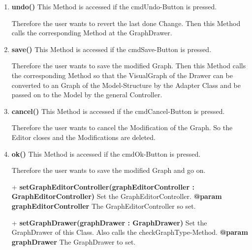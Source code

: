 \documentclass{article}
\begin{document}
\begin{enumerate}[-]
{						Therefore the user wants to add an Clique.
						Then this Method calls the corresponding Method at the GraphDrawer.
						\newline
					}
					\item{
						\textbf{undo()} \newline
						This Method is accessed if the cmdUndo-Button is pressed.
						
						Therefore the user wants to revert the last done Change.
						Then this Method calls the corresponding Method at the GraphDrawer.
						\newline
					}
					\item{
						\textbf{save()} \newline
						This Method is accessed if the cmdSave-Button is pressed.
						
						Therefore the user wants to save the modified Graph.
						Then this Method calls the corresponding Method so that the VisualGraph of the Drawer can be converted to an Graph of the Model-Structure by the Adapter Class and be passed on to the Model by the general Controller.
						\newline
					}
					\item{
						\textbf{cancel()} \newline
						This Method is accessed if the cmdCancel-Button is pressed.
						
						Therefore the user wants to cancel the Modification of the Graph.
						So the Editor closes and the Modifications are deleted.
						\newline
					}
					\item{
						\textbf{ok()} \newline
						This Method is accessed if the cmdOk-Button is pressed.
						
						Therefore the user wants to save the modified Graph and go on.
						\newline
					}
					\item[+]{
						\textbf{setGraphEditorController(graphEditorController : GraphEditorController)} \newline
						Set the GraphEditorController.
						\newline
						\textbf{@param graphEditorController}
							The GraphEditorController so set.
							\newline
					}
					\item[+]{
						\textbf{setGraphDrawer(graphDrawer : GraphDrawer)} \newline
						Set the GraphDrawer of this Class.
						Also calls the checkGraphType-Method.
						\newline
						\textbf{@param graphDrawer}
						The GraphDrawer to set.
						\newline
					}
				\end{enumerate}
		
\end{document}
